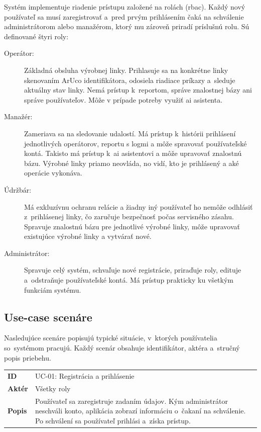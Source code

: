 Systém implementuje riadenie prístupu založené na rolách (\acrshort{rbac}). Každý nový používateľ sa musí zaregistrovať a~pred
prvým prihlásením čaká na schválenie administrátorom alebo manažérom, ktorý mu
zároveň priradí príslušnú rolu. Sú definované štyri roly:

\begin{description}
      \item[Operátor:] Základná obsluha výrobnej linky. Prihlasuje sa na konkrétne linky
            skenovaním ArUco identifikátora, odosiela riadiace príkazy a~sleduje aktuálny
            stav linky. Nemá prístup k~reportom, správe znalostnej
            bázy ani správe používateľov. Môže v prípade potreby využiť \acrshort{ai} asistenta.

      \item[Manažér:] Zameriava sa na sledovanie udalostí. Má prístup k~histórii prihlásení
            jednotlivých operátorov, reportu s logmi a môže spravovať používateľské kontá.
            Takisto má prístup k~\acrshort{ai} asistentovi a môže upravovať znalostnú bázu.
            Výrobné linky priamo neovláda, no vidí, kto je prihlásený a aké operácie vykonáva.

      \item[Údržbár:] Má exkluzívnu ochranu relácie a žiadny iný používateľ ho nemôže
            odhlásiť z~prihlásenej linky, čo zaručuje bezpečnosť počas servisného zásahu.
            Spravuje znalostnú bázu pre jednotlivé výrobné linky, môže upravovať existujúce výrobné linky a vytvárať nové.

      \item[Administrátor:] Spravuje celý systém, schvaľuje nové registrácie, priraďuje
            roly, edituje a~odstraňuje používateľské kontá. Má prístup prakticky ku všetkým
            funkciám systému.
\end{description}

\subsection{Use-case scenáre}

Nasledujúce scenáre popisujú typické situácie, v~ktorých používatelia
so~systémom pracujú. Každý scenár obsahuje identifikátor, aktéra
a~stručný popis priebehu.

\noindent
\begin{tabularx}{\textwidth}{@{}l X@{}}
      \toprule
      \textbf{ID}    & UC-01: Registrácia a prihlásenie           \\
      \textbf{Aktér} & Všetky roly                                \\
      \textbf{Popis} & Používateľ sa zaregistruje zadaním údajov.
      Kým administrátor neschváli konto, aplikácia zobrazí informáciu o~čakaní na schválenie.
      Po schválení sa používateľ prihlási a~získa prístup.        \\
      \bottomrule
\end{tabularx}

